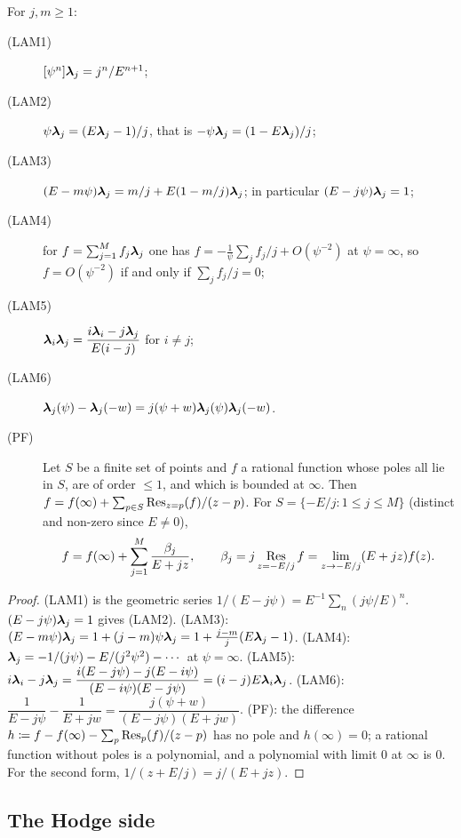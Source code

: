 \begin{lem}
\label{lem:set-leafid}
For $j,m\geq1$:
\begin{description}
\item[(LAM1)] $[\psi^n]\boldsymbol{\lambda}_j=j^n/E^{n+1}$;
\item[(LAM2)] $\psi\boldsymbol{\lambda}_j=(E\boldsymbol{\lambda}_j-1)/j$, that is $-\psi\boldsymbol{\lambda}_j=(1-E\boldsymbol{\lambda}_j)/j$;
\item[(LAM3)] $(E-m\psi)\boldsymbol{\lambda}_j=m/j+E(1-m/j)\boldsymbol{\lambda}_j$; in particular $(E-j\psi)\boldsymbol{\lambda}_j=1$;
\item[(LAM4)] for $f=\sum_{j=1}^{M}f_j\boldsymbol{\lambda}_j$ one has $f=-\frac1\psi\sum_jf_j/j+O(\psi^{-2})$ at $\psi=\infty$, so $f=O(\psi^{-2})$ if and only if $\sum_jf_j/j=0$;
\item[(LAM5)] $\boldsymbol{\lambda}_i\boldsymbol{\lambda}_j=\dfrac{i\boldsymbol{\lambda}_i-j\boldsymbol{\lambda}_j}{E(i-j)}$ for $i\neq j$;
\item[(LAM6)] $\boldsymbol{\lambda}_j(\psi)-\boldsymbol{\lambda}_j(-w)=j(\psi+w)\boldsymbol{\lambda}_j(\psi)\boldsymbol{\lambda}_j(-w)$.
\item[(PF)] Let $S$ be a finite set of points and $f$ a rational function whose poles all lie in $S$, are of order $\leq1$, and which is bounded at $\infty$. Then $f=f(\infty)+\sum_{p\in S}\operatorname*{Res}_{z=p}(f)/(z-p)$. For $S=\{-E/j:1\leq j\leq M\}$ (distinct and non-zero since $E\neq0$),
\[
f=f(\infty)+\sum_{j=1}^{M}\frac{\beta_j}{E+jz},\qquad \beta_j=j\operatorname*{Res}_{z=-E/j}f=\lim_{z\to-E/j}(E+jz)f(z).
\]
\end{description}
\end{lem}

\begin{proof}
(LAM1) is the geometric series $1/(E-j\psi)=E^{-1}\sum_n(j\psi/E)^n$. $(E-j\psi)\boldsymbol{\lambda}_j=1$ gives (LAM2). (LAM3): $(E-m\psi)\boldsymbol{\lambda}_j=1+(j-m)\psi\boldsymbol{\lambda}_j=1+\frac{j-m}{j}(E\boldsymbol{\lambda}_j-1)$. (LAM4): $\boldsymbol{\lambda}_j=-1/(j\psi)-E/(j^2\psi^2)-\cdots$ at $\psi=\infty$. (LAM5): $i\boldsymbol{\lambda}_i-j\boldsymbol{\lambda}_j=\dfrac{i(E-j\psi)-j(E-i\psi)}{(E-i\psi)(E-j\psi)}=(i-j)E\boldsymbol{\lambda}_i\boldsymbol{\lambda}_j$. (LAM6): $\dfrac{1}{E-j\psi}-\dfrac{1}{E+jw}=\dfrac{j(\psi+w)}{(E-j\psi)(E+jw)}$. (PF): the difference $h\coloneqq f-f(\infty)-\sum_p\operatorname*{Res}_p(f)/(z-p)$ has no pole and $h(\infty)=0$; a rational function without poles is a polynomial, and a polynomial with limit $0$ at $\infty$ is $0$. For the second form, $1/(z+E/j)=j/(E+jz)$.
\end{proof}

\subsection{The Hodge side}
\label{sec:set-hodge}


